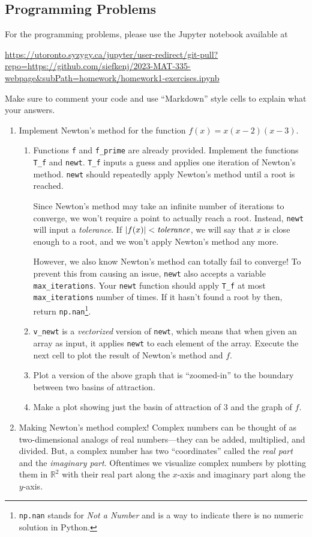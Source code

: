\documentclass[letter]{article}
\newcommand{\R}{\mathbb{R}}
\begin{document}
	\subsection*{Programming Problems}
	For the programming problems, please use the Jupyter notebook available at

	\url{https://utoronto.syzygy.ca/jupyter/user-redirect/git-pull?repo=https://github.com/siefkenj/2023-MAT-335-webpage&subPath=homework/homework1-exercises.ipynb}

	Make sure to comment your code and use ``Markdown'' style cells to explain what your answers.

	\begin{enumerate}
		\item Implement Newton's method for the function $f(x)=x(x-2)(x-3)$.
			\begin{enumerate}
				\item Functions \verb|f| and \verb|f_prime| are already provided. Implement the functions
					\verb|T_f| and \verb|newt|. \verb|T_f| inputs a guess and applies one iteration
					of Newton's method. \verb|newt| should repeatedly apply Newton's method until a root
					is reached.

					Since Newton's method may take an infinite number of iterations to converge, we 
					won't require a point to actually reach a root. Instead, \verb|newt| will input a 
					\emph{tolerance}. If $|f(x)|<\text{\emph{tolerance}}$, we will say that $x$ is 
					close enough to a root, and we won't apply Newton's method any more.

					However, we also know Newton's method can totally fail to converge! To prevent this
					from causing an issue,
					\verb|newt| also accepts a variable \verb|max_iterations|. Your \verb|newt| function
					should apply \verb|T_f| at most \verb|max_iterations| number of times. If it hasn't found
					a root by then, return \verb|np.nan|\footnote{ {\tt np.nan} stands for \emph{Not a Number}
					and is a way to indicate there is no numeric solution in Python.}.
				\item \verb|v_newt| is a \emph{vectorized} version of \verb|newt|, which means that when given an
					array as input, it applies \verb|newt| to each element of the array. Execute the next cell
					to plot the result of Newton's method and $f$.
				\item Plot a version of the above graph that is ``zoomed-in'' to the boundary between two basins of attraction.
				\item Make a plot showing just the basin of attraction of $3$ and the graph of $f$.
			\end{enumerate}
		\item Making Newton's method complex!
			Complex numbers can be thought of as two-dimensional analogs of real numbers---they can be
			added, multiplied, and divided. But, a complex number has two ``coordinates'' called the \emph{real part}
			and the \emph{imaginary part}. Oftentimes we visualize complex numbers by plotting them in $\R^2$
			with their real part along the $x$-axis and imaginary part along the $y$-axis.


\end{enumerate}
\end{document}
